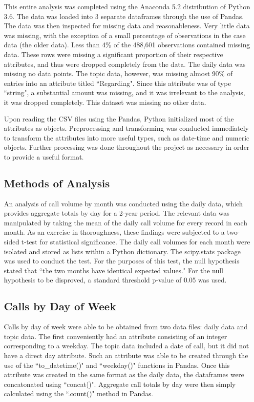 \documentclass{article}
\begin{document}
This entire analysis was completed using the Anaconda 5.2 distribution of Python 3.6.  The data was loaded into 3 separate dataframes through the use of Pandas.  The data was then inspected for missing data and reasonableness.  Very little data was missing, with the exception of a small percentage of observations in the case data (the older data).  Less than 4\% of the 488,601 observations contained missing data.  These rows were missing a significant proportion of their respective attributes, and thus were dropped completely from the data.  The daily data was missing no data points.  The topic data, however, was missing almost 90\% of entries into an attribute titled ``Regarding".  Since this attribute was of type ``string", a substantial amount was missing, and it was irrelevant to the analysis, it was dropped completely.  This dataset was missing no other data.
\par
Upon reading the CSV files using the Pandas, Python initialized most of the attributes as objects.  Preprocessing and transforming was conducted immediately to transform the attributes into more useful types, such as date-time and numeric objects.  Further processing was done throughout the project as necessary in order to provide a useful format.

	\subsection{Methods of Analysis}

An analysis of call volume by month was conducted using the daily data, which provides aggregate totals by day for a 2-year period. The relevant data was manipulated by taking the mean of the daily call volume for every record in each month.  As an exercise in thoroughness, these findings were subjected to a two-sided t-test for statistical significance.  The daily call volumes for each month were isolated and stored as lists within a Python dictionary.  The scipy.stats package was used to conduct the test.  For the purposes of this test, the null hypothesis stated that ``the two months have identical expected values."  For the null hypothesis to be disproved, a standard threshold p-value of 0.05 was used.

	\subsection{Calls by Day of Week}

Calls by day of week were able to be obtained from two data files:  daily data and topic data.  The first conveniently had an attribute consisting of an integer corresponding to a weekday.  The topic data included a date of call, but it did not have a direct day attribute.  Such an attribute was able to be created through the use of the ``to\_datetime()" and ``weekday()" functions in Pandas.  Once this attribute was created in the same format as the daily data, the dataframes were concatonated using ``concat()".  Aggregate call totals by day were then simply calculated using the ``.count()" method in Pandas.
\end{document}
